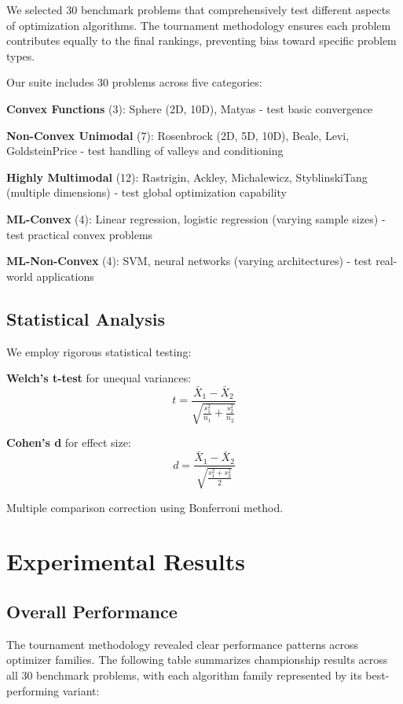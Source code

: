 We selected 30 benchmark problems that comprehensively test different aspects of optimization algorithms. The tournament methodology ensures each problem contributes equally to the final rankings, preventing bias toward specific problem types.

Our suite includes 30 problems across five categories:

\textbf{Convex Functions} (3): Sphere (2D, 10D), Matyas - test basic convergence

\textbf{Non-Convex Unimodal} (7): Rosenbrock (2D, 5D, 10D), Beale, Levi, GoldsteinPrice - test handling of valleys and conditioning

\textbf{Highly Multimodal} (12): Rastrigin, Ackley, Michalewicz, StyblinskiTang (multiple dimensions) - test global optimization capability

\textbf{ML-Convex} (4): Linear regression, logistic regression (varying sample sizes) - test practical convex problems

\textbf{ML-Non-Convex} (4): SVM, neural networks (varying architectures) - test real-world applications

\hypertarget{statistical-analysis}{%
\subsection{Statistical Analysis}\label{statistical-analysis}}

We employ rigorous statistical testing:

\textbf{Welch's t-test} for unequal variances:
\[t = \frac{\bar{X}_1 - \bar{X}_2}{\sqrt{\frac{s_1^2}{n_1} + \frac{s_2^2}{n_2}}}\]

\textbf{Cohen's d} for effect size:
\[d = \frac{\bar{X}_1 - \bar{X}_2}{\sqrt{\frac{s_1^2 + s_2^2}{2}}}\]

Multiple comparison correction using Bonferroni method.

\hypertarget{experimental-results}{%
\section{Experimental Results}\label{experimental-results}}

\hypertarget{overall-performance}{%
\subsection{Overall Performance}\label{overall-performance}}

The tournament methodology revealed clear performance patterns across optimizer families. The following table summarizes championship results across all 30 benchmark problems, with each algorithm family represented by its best-performing variant:

